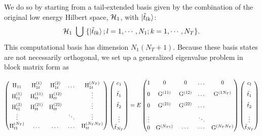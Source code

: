 \documentclass[twocolumn,secnumarabic,amssymb, nobibnotes, aps, prd]{revtex4-2}
\begin{document}
We do so by starting from a tail-extended basis given by the combination of the original low energy Hilbert space, ${\cal H}_1$, with $\ket{\tilde t_{lk}}$:
\begin{equation}\label{comp_space}
    {\cal H}_1~\bigcup~\{\ket{\tilde t_{lk}};l=1,\cdots,N_1;k=1,\cdots, N_T\}.
\end{equation}
This computational basis has dimension $N_1(N_T+1)$.  Because these basis states are not necessarily orthogonal, we set
up a generalized eigenvalue problem
in block matrix form as
\begin{widetext}
\begin{equation}\label{eigen}
\begin{pmatrix}
   {\rm H}_{11} & {\rm H}_{1t}^{(1)} & {\rm H}_{1t}^{(2)} &\dots & {\rm H}_{1t}^{(N_T)} \\
   {\rm H}_{t1}^{(1)} & {\rm H}_{tt}^{(11)} & {\rm H}_{tt}^{(12)} &  & \vdots\\
   {\rm H}_{t1}^{(2)} & {\rm H}_{tt}^{(21)} & {\rm H}_{tt}^{(22)} & & \vdots \\
   \vdots & & & \ddots & \vdots  \\
   {\rm H}_{t1}^{(N_T)} & \dots & \dots & \dots & {\rm H}_{tt}^{(N_TN_T)}
    \end{pmatrix}
   \begin{pmatrix}
    c_1 \\[.1in]
    \tilde t_1 \\[.1in]
    \tilde t_2 \\[.1in]
    \vdots \\
    \tilde t_{N_T}
\end{pmatrix}
   = E
    \begin{pmatrix}
        1 & 0 & 0 &\dots & 0 \\[.1in]
        0 & {\rm G}^{(11)} & {\rm G}^{(12)} & \dots & {\rm G}^{(1N_T)} \\[.1in]
        0 & {\rm G}^{(21)} & {\rm G}^{(22)} & \dots & \\[.1in]
        \vdots & & & \ddots & \\
        0 & {\rm G}^{(N_{T1})} & \cdots & \cdots & {\rm G}^{(N_TN_T)}
  \end{pmatrix}
  \begin{pmatrix}
    c_l \\[.1in]
    \tilde t_1 \\[.1in]
    \tilde t_2 \\[.1in]
    \vdots \\
    \tilde t_{N_T}
  \end{pmatrix}
 \end{equation}
\end{widetext}
\end{document}
